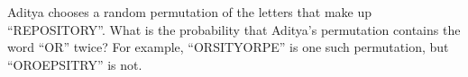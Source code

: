 Aditya chooses a random permutation of the letters that make up ``REPOSITORY''. What is the probability that Aditya's permutation contains the word ``OR'' twice? For example, ``ORSITYORPE'' is one such permutation, but ``OROEPSITRY'' is not.
